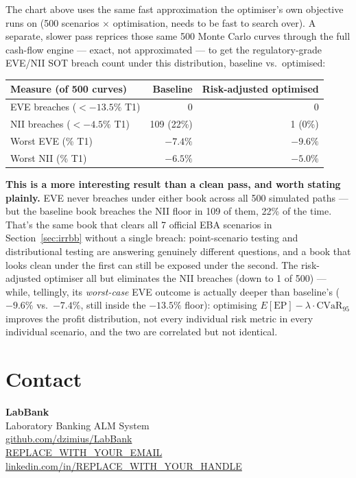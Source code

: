 \documentclass[11pt,a4paper]{article}
\begin{document}
The chart above uses the same fast approximation the optimiser's own
objective runs on (500 scenarios $\times$ optimisation, needs to be fast to
search over). A separate, slower pass reprices those same 500 Monte Carlo
curves through the full cash-flow engine --- exact, not approximated --- to
get the regulatory-grade EVE/NII SOT breach count under this distribution,
baseline vs.\ optimised:

\begin{center}
\small
\begin{tabular}{@{}lrr@{}}
\toprule
\textbf{Measure (of 500 curves)} & \textbf{Baseline} & \textbf{Risk-adjusted optimised} \\
\midrule
EVE breaches ($< -13.5\%$ T1) & 0 & 0 \\
NII breaches ($< -4.5\%$ T1)  & 109 (22\%) & 1 (0\%) \\
Worst EVE (\% T1)             & $-7.4\%$   & $-9.6\%$ \\
Worst NII (\% T1)             & $-6.5\%$   & $-5.0\%$ \\
\bottomrule
\end{tabular}
\end{center}

\textbf{This is a more interesting result than a clean pass, and worth
stating plainly.} EVE never breaches under either book across all 500
simulated paths --- but the baseline book breaches the NII floor in 109 of
them, 22\% of the time. That's the same book that clears all 7 official EBA
scenarios in Section~\ref{sec:irrbb} without a single breach: point-scenario
testing and distributional testing are answering genuinely different
questions, and a book that looks clean under the first can still be exposed
under the second. The risk-adjusted optimiser all but eliminates the NII
breaches (down to 1 of 500) --- while, tellingly, its \textit{worst-case} EVE
outcome is actually deeper than baseline's ($-9.6\%$ vs.\ $-7.4\%$, still
inside the $-13.5\%$ floor): optimising
$E[\mathrm{EP}] - \lambda\cdot\mathrm{CVaR}_{95}$ improves the profit
distribution, not every individual risk metric in every individual
scenario, and the two are correlated but not identical.

\section*{Contact}

\begin{center}
\large\color{labdark}\textbf{LabBank}\\[4pt]
\normalsize\color{labgrey}Laboratory Banking ALM System\\[16pt]
\normalsize\color{black}
\href{https://github.com/dzimius/LabBank}{github.com/dzimius/LabBank}\\[6pt]
\href{mailto:REPLACE_WITH_YOUR_EMAIL}{REPLACE\_WITH\_YOUR\_EMAIL}\\[6pt]
\href{https://www.linkedin.com/in/REPLACE_WITH_YOUR_HANDLE}{linkedin.com/in/REPLACE\_WITH\_YOUR\_HANDLE}
\end{center}
\end{document}
